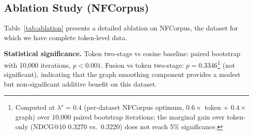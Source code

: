 \documentclass[review,1p]{elsarticle}
\begin{document}
\subsection{Ablation Study (NFCorpus)}
\label{subsec:ablation}

Table~\ref{tab:ablation} presents a detailed ablation on NFCorpus, the dataset for which we have complete token-level data.

\begin{table}[ht]
\centering
\caption{NFCorpus ablation (NDCG@10).}
\label{tab:ablation}
\end{table}

\textbf{Statistical significance.} Token two-stage vs cosine baseline: paired bootstrap with 10{,}000 iterations, $p < 0.001$. Fusion vs token two-stage: $p = 0.3346$\footnote{Computed at $\lambda^\star=0.4$ (per-dataset NFCorpus optimum, $0.6 \times$ token + $0.4 \times$ graph) over 10,000 paired bootstrap iterations; the marginal gain over token-only (NDCG@10 0.3270 vs.\ 0.3220) does not reach 5\% significance.} (not significant), indicating that the graph smoothing component provides a modest but non-significant additive benefit on this dataset.
\end{document}
